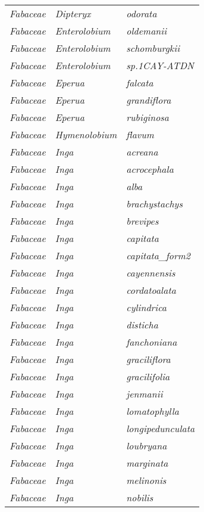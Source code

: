 \documentclass[fleqn,10pt]{ArtEcoFoG} %
\renewenvironment{table}{\begin{table*}}{\end{table*}\ignorespacesafterend}
\begin{document}
\begin{table}
\begin{tabular}[t]{lll}
\em{Fabaceae} & \em{Dipteryx} & \em{odorata}\\
\em{Fabaceae} & \em{Enterolobium} & \em{oldemanii}\\
\em{Fabaceae} & \em{Enterolobium} & \em{schomburgkii}\\
\em{Fabaceae} & \em{Enterolobium} & \em{sp.1CAY-ATDN}\\
\addlinespace
\em{Fabaceae} & \em{Eperua} & \em{falcata}\\
\em{Fabaceae} & \em{Eperua} & \em{grandiflora}\\
\em{Fabaceae} & \em{Eperua} & \em{rubiginosa}\\
\em{Fabaceae} & \em{Hymenolobium} & \em{flavum}\\
\em{Fabaceae} & \em{Inga} & \em{acreana}\\
\addlinespace
\em{Fabaceae} & \em{Inga} & \em{acrocephala}\\
\em{Fabaceae} & \em{Inga} & \em{alba}\\
\em{Fabaceae} & \em{Inga} & \em{brachystachys}\\
\em{Fabaceae} & \em{Inga} & \em{brevipes}\\
\em{Fabaceae} & \em{Inga} & \em{capitata}\\
\addlinespace
\em{Fabaceae} & \em{Inga} & \em{capitata\_form2}\\
\em{Fabaceae} & \em{Inga} & \em{cayennensis}\\
\em{Fabaceae} & \em{Inga} & \em{cordatoalata}\\
\em{Fabaceae} & \em{Inga} & \em{cylindrica}\\
\em{Fabaceae} & \em{Inga} & \em{disticha}\\
\addlinespace
\em{Fabaceae} & \em{Inga} & \em{fanchoniana}\\
\em{Fabaceae} & \em{Inga} & \em{graciliflora}\\
\em{Fabaceae} & \em{Inga} & \em{gracilifolia}\\
\em{Fabaceae} & \em{Inga} & \em{jenmanii}\\
\em{Fabaceae} & \em{Inga} & \em{lomatophylla}\\
\addlinespace
\em{Fabaceae} & \em{Inga} & \em{longipedunculata}\\
\em{Fabaceae} & \em{Inga} & \em{loubryana}\\
\em{Fabaceae} & \em{Inga} & \em{marginata}\\
\em{Fabaceae} & \em{Inga} & \em{melinonis}\\
\em{Fabaceae} & \em{Inga} & \em{nobilis}\\

\end{tabular}
\end{table}
\end{document}

